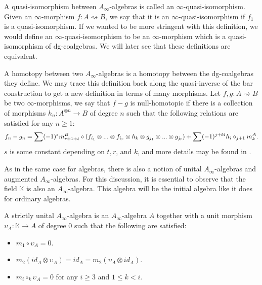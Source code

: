 \documentclass[../thesis.tex]{subfiles}
\begin{document}
        A quasi-isomorphism between $A_\infty$-algebras is called an $\infty$-quasi-isomorphism. Given an $\infty$-morphism $f: A\rightsquigarrow B$, we say that it is an $\infty$-quasi-isomorphism if $f_1$ is a quasi-isomorphism. If we wanted to be more stringent with this definition, we would define an $\infty$-quasi-isomorphism to be an $\infty$-morphism which is a quasi-isomorphism of dg-coalgebras. We will later see that these definitions are equivalent.

        A homotopy between two $A_\infty$-algebras is a homotopy between the dg-coalgebras they define. We may trace this definition back along the quasi-inverse of the bar construction to get a new definition in terms of many morphisms.  Let $f,g: A\rightsquigarrow B$ be two $\infty$-morphisms, we say that $f-g$ is null-homotopic if there is a collection of morphisms $h_n : A^{\otimes n} \rightarrow B$ of degree $n$ such that the following relations are satisfied for any $n \geq 1$:
        \begin{multline*}
            f_n - g_n = \sum (-1)^s m^B_{r+1+t}\circ (f_{i_1}\otimes ... \otimes f_{i_r} \otimes h_k \otimes g_{j_1} \otimes ... \otimes g_{j_t}) +  \sum (-1)^{j+kl}h_i \circ_{j+1} m_k^A\tt{.}
        \end{multline*}
        $s$ is some constant depending on $t,r$, and $k$, and more details may be found in \cite{LefevreHasegawa03}.

        As in the same case for algebras, there is also a notion of unital $A_\infty$-algebras and augmented $A_\infty$-algebras. For this discussion, it is essential to observe that the field $\mathbb{K}$ is also an $A_\infty$-algebra. This algebra will be the initial algebra like it does for ordinary algebras.

        \begin{definition}\label{def: strict-unit}
            A strictly unital $A_\infty$-algebra is an $A_\infty$-algebra $A$ together with a unit morphism $\upsilon_A : \mathbb{K} \rightarrow A$ of degree $0$ such that the following are satisfied:
            \begin{itemize}
                \item $m_1\circ \upsilon_A = 0$.
                \item $m_2(id_A \otimes \upsilon_A) = id_A = m_2(\upsilon_A\otimes id_A)$.
                \item $m_i \circ_k \upsilon_A = 0$ for any $i\geq 3$ and $1 \leq k < i$.
            \end{itemize}
        \end{definition}
\end{document}
